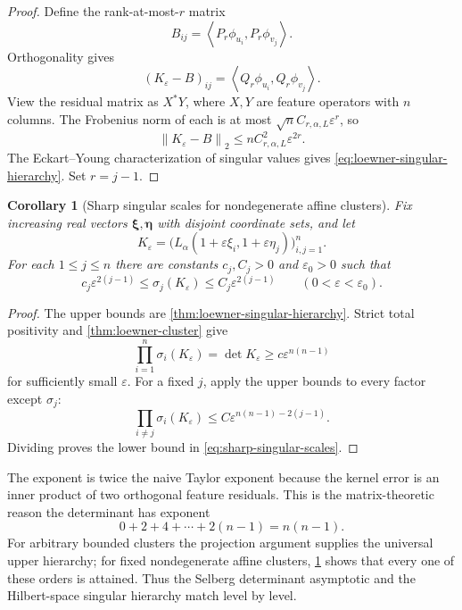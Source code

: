 \documentclass[11pt,oneside]{article}
\newtheorem{corollary}[theorem]{Corollary}
\theoremstyle{definition}
\theoremstyle{remark}
\newcommand{\norm}[1]{\left\lVert #1\right\rVert}
\newcommand{\inner}[2]{\left\langle #1,#2\right\rangle}
\newcommand{\eps}{\varepsilon}
\begin{document}
\begin{proof}
Define the rank-at-most-$r$ matrix
\[
 B_{ij}=\inner{P_r\phi_{u_i}}{P_r\phi_{v_j}}.
\]
Orthogonality gives
\[
 (K_\eps-B)_{ij}=\inner{Q_r\phi_{u_i}}{Q_r\phi_{v_j}}.
\]
View the residual matrix as $X^*Y$, where $X,Y$ are feature operators with $n$ columns.  The Frobenius norm of each is at most $\sqrt n C_{r,\alpha,L}\eps^r$, so
\[
 \norm{K_\eps-B}_2\le nC_{r,\alpha,L}^2\eps^{2r}.
\]
The Eckart--Young characterization of singular values gives \eqref{eq:loewner-singular-hierarchy}.  Set $r=j-1$.
\end{proof}

\begin{corollary}[Sharp singular scales for nondegenerate affine clusters]
\label{cor:loewner-singular-sharp}
Fix increasing real vectors $\bm\xi,\bm\eta$ with disjoint coordinate sets, and let
\[
 K_\eps=\bigl(L_\alpha(1+\eps\xi_i,1+\eps\eta_j)\bigr)_{i,j=1}^n.
\]
For each $1\le j\le n$ there are constants $c_j,C_j>0$ and $\eps_0>0$ such that
\begin{equation}
 c_j\eps^{2(j-1)}\le\sigma_j(K_\eps)
 \le C_j\eps^{2(j-1)}
 \qquad(0<\eps<\eps_0).
 \label{eq:sharp-singular-scales}
\end{equation}
\end{corollary}

\begin{proof}
The upper bounds are \cref{thm:loewner-singular-hierarchy}.  Strict total positivity and \cref{thm:loewner-cluster} give
\[
 \prod_{i=1}^n\sigma_i(K_\eps)=\det K_\eps
 \ge c\eps^{n(n-1)}
\]
for sufficiently small $\eps$.  For a fixed $j$, apply the upper bounds to every factor except $\sigma_j$:
\[
 \prod_{i\ne j}\sigma_i(K_\eps)
 \le C\eps^{n(n-1)-2(j-1)}.
\]
Dividing proves the lower bound in \eqref{eq:sharp-singular-scales}.
\end{proof}

\begin{resultbox}
The exponent is twice the naive Taylor exponent because the kernel error is an inner product of two orthogonal feature residuals.  This is the matrix-theoretic reason the determinant has exponent
\[
 0+2+4+\cdots+2(n-1)=n(n-1).
\]
For arbitrary bounded clusters the projection argument supplies the universal upper hierarchy; for fixed nondegenerate affine clusters, \cref{cor:loewner-singular-sharp} shows that every one of these orders is attained.  Thus the Selberg determinant asymptotic and the Hilbert-space singular hierarchy match level by level.
\end{resultbox}
\end{document}
